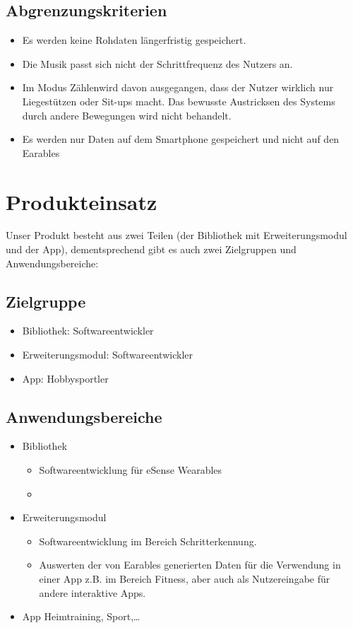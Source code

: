 \documentclass[a4paper,12pt]{article}
\begin{document}
  \subsection{Abgrenzungskriterien}
  \begin{itemize}
    \item Es werden keine \Gls{Rohdaten} längerfristig gespeichert.
    \item Die Musik passt sich nicht der \Gls{Schrittfrequenz} des Nutzers an.
    \item Im Modus \glqq Zählen\grqq{}wird davon ausgegangen, dass der Nutzer wirklich nur Liegestützen oder Sit-ups macht. Das bewusste Austricksen des Systems durch andere Bewegungen wird nicht behandelt.
    \item Es werden nur Daten auf dem Smartphone gespeichert und nicht auf den \Gls{Earables}
  \end{itemize}

\section{Produkteinsatz}
Unser Produkt besteht aus zwei Teilen (der Bibliothek mit Erweiterungsmodul und der App), dementsprechend gibt es auch zwei Zielgruppen und Anwendungsbereiche:
  \subsection{Zielgruppe}
  \begin{itemize}
    \item\textsf{Bibliothek:} Softwareentwickler
    \item\textsf{Erweiterungsmodul:} Softwareentwickler
    \item\textsf{App:} Hobbysportler
  \end{itemize}
  \subsection{Anwendungsbereiche}
    \begin{itemize}
      \item\textsf{Bibliothek} \begin{itemize}
        \item[] Softwareentwicklung für eSense Wearables 
        \item[] %
      \end{itemize}
      \item\textsf{Erweiterungsmodul}
      \begin{itemize}
        \item[] Softwareentwicklung im Bereich Schritterkennung.
        \item[] Auswerten der von \Gls{Earables} generierten Daten für die Verwendung in einer App z.B. im Bereich Fitness, aber auch als Nutzereingabe für andere interaktive Apps.
      \end{itemize}
      \item\textsf{App} Heimtraining, Sport,\dots
    \end{itemize}
\end{document}

